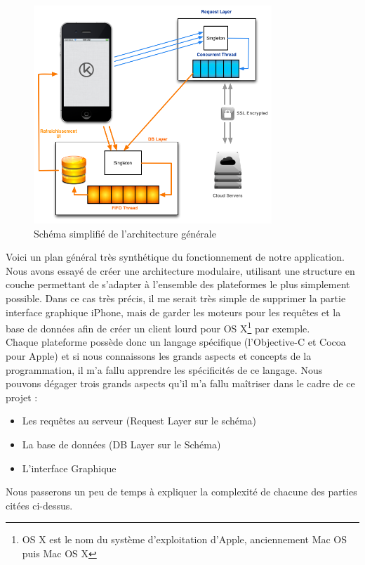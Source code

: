 \documentclass{article}
\begin{document}
\begin{figure}[H]
  		\begin{center}
			\includegraphics[width=0.8\textwidth]{Images/schema_general_simplifie.png}
  			\caption{Schéma simplifié de l'architecture générale}
  			\label{fig:archi}
		\end{center}
	\end{figure}

Voici un plan général très synthétique du fonctionnement de notre application. Nous avons essayé de créer une architecture modulaire, utilisant une structure en couche permettant de s'adapter à l'ensemble des plateformes le plus simplement possible. Dans ce cas très précis, il me serait très simple de supprimer la partie interface graphique iPhone, mais de garder les moteurs pour les requêtes et la base de données afin de créer un client lourd pour OS X\footnote{OS X est le nom du système d'exploitation d'Apple, anciennement Mac OS puis Mac OS X} par exemple.\\

Chaque plateforme possède donc un langage spécifique (l'Objective-C et Cocoa pour Apple) et si nous connaissons les grands aspects et concepts de la programmation, il m'a fallu apprendre les spécificités de ce langage. Nous pouvons dégager trois grands aspects qu'il m'a fallu maîtriser dans le cadre de ce projet : 


\begin{itemize}
	\item Les requêtes au serveur (Request Layer sur le schéma)
	\item La base de données (DB Layer sur le Schéma)
	\item L'interface Graphique\\
\end{itemize}
Nous passerons un peu de temps à expliquer la complexité de chacune des parties citées ci-dessus.
\end{document}
